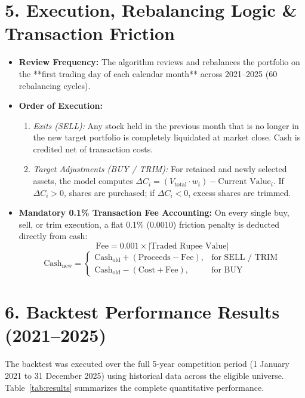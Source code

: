 \documentclass[11pt,a4paper]{article}
\begin{document}
\section{5. Execution, Rebalancing Logic \& Transaction Friction}
\begin{itemize}[leftmargin=1.5em]
    \item \textbf{Review Frequency:} The algorithm reviews and rebalances the portfolio on the **first trading day of each calendar month** across 2021--2025 (60 rebalancing cycles).
    \item \textbf{Order of Execution:}
    \begin{enumerate}[label=\arabic*., itemsep=0.1em]
        \item \textit{Exits (SELL):} Any stock held in the previous month that is no longer in the new target portfolio is completely liquidated at market close. Cash is credited net of transaction costs.
        \item \textit{Target Adjustments (BUY / TRIM):} For retained and newly selected assets, the model computes $\Delta C_i = (V_{\text{total}} \cdot w_i) - \text{Current Value}_i$. If $\Delta C_i > 0$, shares are purchased; if $\Delta C_i < 0$, excess shares are trimmed.
    \end{enumerate}
    \item \textbf{Mandatory 0.1\% Transaction Fee Accounting:} On every single buy, sell, or trim execution, a flat 0.1\% ($0.0010$) friction penalty is deducted directly from cash:
    \begin{equation}
        \text{Fee} = 0.001 \times |\text{Traded Rupee Value}|
    \end{equation}
    \begin{equation}
        \text{Cash}_{\text{new}} = 
        \begin{cases}
            \text{Cash}_{\text{old}} + (\text{Proceeds} - \text{Fee}), & \text{for SELL / TRIM} \\
            \text{Cash}_{\text{old}} - (\text{Cost} + \text{Fee}), & \text{for BUY}
        \end{cases}
    \end{equation}
\end{itemize}

\section{6. Backtest Performance Results (2021--2025)}
The backtest was executed over the full 5-year competition period (1 January 2021 to 31 December 2025) using historical data across the eligible universe. Table~\ref{tab:results} summarizes the complete quantitative performance.
\end{document}
